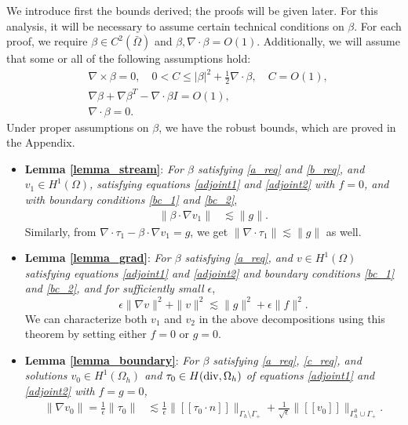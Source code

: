 \documentclass[11pt,onecolumn]{scrartcl}
\newcommand{\LRs}[1]{\left[ #1 \right]}
\newcommand{\jump}[1] {\ensuremath{\LRs{\![#1]\!}}}
\newcommand{\Gh}{\Gamma_h}
\newcommand{\Oh}{\Omega_h}
\newcommand{\grad}{\nabla}
\newcommand{\curl}{\grad \times}
\renewcommand{\div}{\grad \cdot}
\begin{document}
We introduce first the bounds derived; the proofs will be given later. For this analysis, it will be necessary to assume certain technical conditions on $\beta$.  For each proof, we require $\beta \in C^2(\bar{\Omega})$ and $\beta, \div \beta = O(1)$.  Additionally, we will assume that some or all of the following assumptions hold:
\begin{align}
&\curl \beta = 0, \quad 0<C \leq \left | \beta\right |^2 + \frac{1}{2}\div \beta, \quad C = O(1) \label{a_req},\\
&\grad \beta + \grad \beta ^T - \div \beta I = O(1) \label{b_req},\\
&\div \beta = 0 \label{c_req}.
\end{align}
Under proper assumptions on $\beta$, we have the robust bounds, which are proved in the Appendix. 
\begin{itemize}
\item \textbf{Lemma \ref{lemma_stream}}: \textit{For $\beta$ satisfying \eqref{a_req} and \eqref{b_req}, %
and $v_1 \in H^1(\Omega)$, satisfying equations \eqref{adjoint1} and \eqref{adjoint2} with $f=0$, and with boundary conditions \eqref{bc_1} and \eqref{bc_2}},
\begin{align*}
\|\beta \cdot \grad v_1 \| &\lesssim \| g\|.
\end{align*}
Similarly, from $\div \tau_1 - \beta\cdot \grad v_1 = g$, we get $\|\div \tau_1\| \lesssim \|g\|$ as well.  
\item \textbf{Lemma \ref{lemma_grad}}: \textit{For $\beta$ satisfying \eqref{a_req}, and $v \in H^1(\Omega)$ satisfying equations \eqref{adjoint1} and \eqref{adjoint2} and boundary conditions \eqref{bc_1} and \eqref{bc_2}, and for sufficiently small $\epsilon$},
\[
\epsilon \|\grad v\|^2 + \|v\|^2 \lesssim \|g\|^2 + \epsilon \|f\|^2.
\]
We can characterize both $v_1$ and $v_2$ in the above decompositions using this theorem by setting either $f=0$ or $g=0$. 
\item \textbf{Lemma \ref{lemma_boundary}}: \textit{For $\beta$ satisfying \eqref{a_req}, \eqref{c_req}, and solutions $v_0 \in H^1(\Oh)$ and $\tau_0 \in H({\rm div},\Oh)$ of equations \eqref{adjoint1} and \eqref{adjoint2} with $f=g=0$,} 
\begin{align*}
\|\grad v_0\| = \frac{1}{\epsilon}\|\tau_0\| &\lesssim \frac{1}{\epsilon} \| \jump{\tau_0\cdot n}\|_{\Gh \setminus \Gamma_+} + \frac{1}{\sqrt{\epsilon}} \| \jump{v_0}\|_{\Gh^0 \cup \Gamma_+}.
\end{align*}
\end{itemize}
\end{document}
